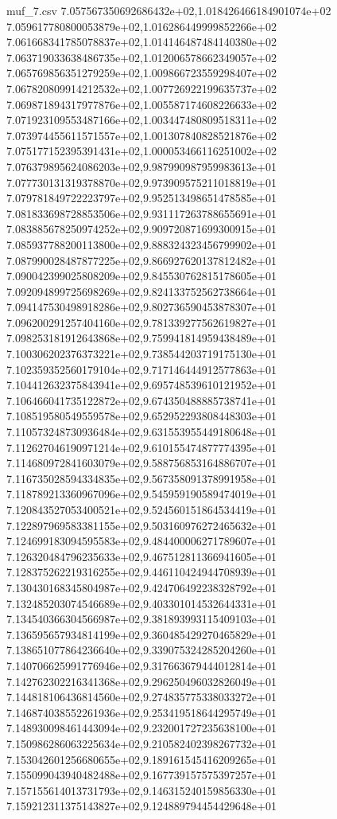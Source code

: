 \begin{filecontents*}{muf_7.csv}
7.057567350692686432e+02,1.018426466184901074e+02
7.059617780800053879e+02,1.016286449999852266e+02
7.061668341785078837e+02,1.014146487484140380e+02
7.063719033638486735e+02,1.012006578662349057e+02
7.065769856351279259e+02,1.009866723559298407e+02
7.067820809914212532e+02,1.007726922199635737e+02
7.069871894317977876e+02,1.005587174608226633e+02
7.071923109553487166e+02,1.003447480809518311e+02
7.073974455611571557e+02,1.001307840828521876e+02
7.075177152395391431e+02,1.000053466116251002e+02
7.076379895624086203e+02,9.987990987959983613e+01
7.077730131319378870e+02,9.973909575211018819e+01
7.079781849722223797e+02,9.952513498651478585e+01
7.081833698728853506e+02,9.931117263788655691e+01
7.083885678250974252e+02,9.909720871699300915e+01
7.085937788200113800e+02,9.888324323456799902e+01
7.087990028487877225e+02,9.866927620137812482e+01
7.090042399025808209e+02,9.845530762815178605e+01
7.092094899725698269e+02,9.824133752562738664e+01
7.094147530498918286e+02,9.802736590453878307e+01
7.096200291257404160e+02,9.781339277562619827e+01
7.098253181912643868e+02,9.759941814959438489e+01
7.100306202376373221e+02,9.738544203719175130e+01
7.102359352560179104e+02,9.717146444912577863e+01
7.104412632375843941e+02,9.695748539610121952e+01
7.106466041735122872e+02,9.674350488885738741e+01
7.108519580549559578e+02,9.652952293808448303e+01
7.110573248730936484e+02,9.631553955449180648e+01
7.112627046190971214e+02,9.610155474877774395e+01
7.114680972841603079e+02,9.588756853164886707e+01
7.116735028594334835e+02,9.567358091378991958e+01
7.118789213360967096e+02,9.545959190589474019e+01
7.120843527053400521e+02,9.524560151864534419e+01
7.122897969583381155e+02,9.503160976272465632e+01
7.124699183094595583e+02,9.484400006271789607e+01
7.126320484796235633e+02,9.467512811366941605e+01
7.128375262219316255e+02,9.446110424944708939e+01
7.130430168345804987e+02,9.424706492238328792e+01
7.132485203074546689e+02,9.403301014532644331e+01
7.134540366304566987e+02,9.381893993115409103e+01
7.136595657934814199e+02,9.360485429270465829e+01
7.138651077864236640e+02,9.339075324285204260e+01
7.140706625991776946e+02,9.317663679444012814e+01
7.142762302216341368e+02,9.296250496032826049e+01
7.144818106436814560e+02,9.274835775338033272e+01
7.146874038552261936e+02,9.253419518644295749e+01
7.148930098461443094e+02,9.232001727235638100e+01
7.150986286063225634e+02,9.210582402398267732e+01
7.153042601256680655e+02,9.189161545416209265e+01
7.155099043940482488e+02,9.167739157575397257e+01
7.157155614013731793e+02,9.146315240159856330e+01
7.159212311375143827e+02,9.124889794454429648e+01

\end{filecontents*}

